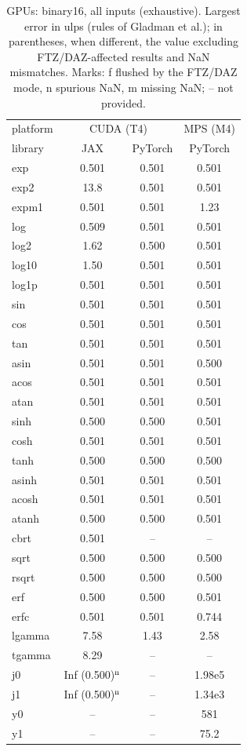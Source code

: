 \begin{table}
\centering
\begin{small}
\begin{tabular}{|l|cc|c|}
\hline
platform & \multicolumn{2}{c|}{CUDA (T4)} & \multicolumn{1}{c|}{MPS (M4)} \\
library & JAX & PyTorch & PyTorch \\ \hline
exp & 0.501 & 0.501 & 0.501 \\
exp2 & 13.8 & 0.501 & 0.501 \\
expm1 & 0.501 & 0.501 & 1.23 \\
log & 0.509 & 0.501 & 0.501 \\
log2 & 1.62 & 0.500 & 0.501 \\
log10 & 1.50 & 0.501 & 0.501 \\
log1p & 0.501 & 0.501 & 0.501 \\
sin & 0.501 & 0.501 & 0.501 \\
cos & 0.501 & 0.501 & 0.501 \\
tan & 0.501 & 0.501 & 0.501 \\
asin & 0.501 & 0.501 & 0.500 \\
acos & 0.501 & 0.501 & 0.501 \\
atan & 0.501 & 0.501 & 0.501 \\
sinh & 0.500 & 0.500 & 0.501 \\
cosh & 0.501 & 0.501 & 0.501 \\
tanh & 0.500 & 0.500 & 0.500 \\
asinh & 0.501 & 0.501 & 0.501 \\
acosh & 0.501 & 0.501 & 0.501 \\
atanh & 0.500 & 0.500 & 0.501 \\
cbrt & 0.501 & -- & -- \\
sqrt & 0.500 & 0.500 & 0.500 \\
rsqrt & 0.500 & 0.500 & 0.500 \\
erf & 0.500 & 0.500 & 0.501 \\
erfc & 0.501 & 0.501 & 0.744 \\
lgamma & 7.58 & 1.43 & 2.58 \\
tgamma & 8.29 & -- & -- \\
j0 & Inf (0.500)$^{\rm n}$ & -- & 1.98e5 \\
j1 & Inf (0.500)$^{\rm n}$ & -- & 1.34e3 \\
y0 & -- & -- & 581 \\
y1 & -- & -- & 75.2 \\
\hline
\end{tabular}
\end{small}
\caption{GPUs: binary16, all inputs (exhaustive). Largest error in ulps (rules of Gladman et al.); in parentheses, when different, the value excluding FTZ/DAZ-affected results and NaN mismatches. Marks: f flushed by the FTZ/DAZ mode, n spurious NaN, m missing NaN; -- not provided.}
\label{tab:b16gpu}
\end{table}
